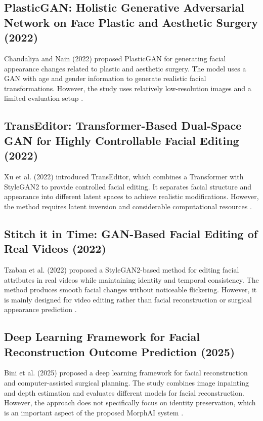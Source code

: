 \subsection{PlasticGAN: Holistic Generative Adversarial Network on Face Plastic and Aesthetic Surgery (2022)}

Chandaliya and Nain (2022) proposed PlasticGAN for generating facial appearance changes related to plastic and aesthetic surgery. The model uses a GAN with age and gender information to generate realistic facial transformations. However, the study uses relatively low-resolution images and a limited evaluation setup \cite{chandaliya2022plasticgan}.

\subsection{TransEditor: Transformer-Based Dual-Space GAN for Highly Controllable Facial Editing (2022)}

Xu et al. (2022) introduced TransEditor, which combines a Transformer with StyleGAN2 to provide controlled facial editing. It separates facial structure and appearance into different latent spaces to achieve realistic modifications. However, the method requires latent inversion and considerable computational resources \cite{xu2022transeditor}.

\subsection{Stitch it in Time: GAN-Based Facial Editing of Real Videos (2022)}

Tzaban et al. (2022) proposed a StyleGAN2-based method for editing facial attributes in real videos while maintaining identity and temporal consistency. The method produces smooth facial changes without noticeable flickering. However, it is mainly designed for video editing rather than facial reconstruction or surgical appearance prediction \cite{tzaban2022stitch}.

\subsection{Deep Learning Framework for Facial Reconstruction Outcome Prediction (2025)}

Bini et al. (2025) proposed a deep learning framework for facial reconstruction and computer-assisted surgical planning. The study combines image inpainting and depth estimation and evaluates different models for facial reconstruction. However, the approach does not specifically focus on identity preservation, which is an important aspect of the proposed MorphAI system \cite{bini2025facial}.


